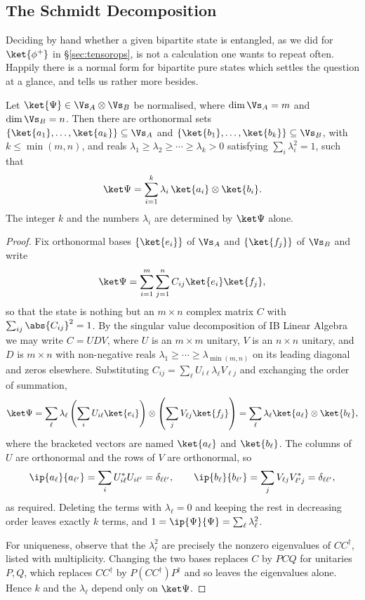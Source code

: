 \subsection{The Schmidt Decomposition}\label{sec:schmidt}

Deciding by hand whether a given bipartite state is entangled, as we did for $\ket{\phi^+}$ in \S\ref{sec:tensorops}, is not a calculation one wants to repeat often. Happily there is a normal form for bipartite pure states which settles the question at a glance, and tells us rather more besides.

\begin{theorem}
	Let $\ket{\Psi}\in\Vs_A\otimes\Vs_B$ be normalised, where $\dim\Vs_A = m$ and $\dim\Vs_B = n$. Then there are orthonormal sets $\{\ket{a_1},\dots,\ket{a_k}\}\subseteq\Vs_A$ and $\{\ket{b_1},\dots,\ket{b_k}\}\subseteq\Vs_B$, with $k\leq\min(m,n)$, and reals $\lambda_1\geq\lambda_2\geq\cdots\geq\lambda_k>0$ satisfying $\sum_i\lambda_i^2 = 1$, such that
	$$\ket\Psi = \sum_{i=1}^k\lambda_i\,\ket{a_i}\otimes\ket{b_i}.$$
	The integer $k$ and the numbers $\lambda_i$ are determined by $\ket\Psi$ alone.
\end{theorem}

\begin{proof}
	Fix orthonormal bases $\{\ket{e_i}\}$ of $\Vs_A$ and $\{\ket{f_j}\}$ of $\Vs_B$ and write
	$$\ket\Psi = \sum_{i=1}^m\sum_{j=1}^nC_{ij}\ket{e_i}\ket{f_j},$$
	so that the state is nothing but an $m\times n$ complex matrix $C$ with $\sum_{ij}\abs{C_{ij}}^2 = 1$. By the singular value decomposition of IB Linear Algebra we may write $C = UDV$, where $U$ is an $m\times m$ unitary, $V$ is an $n\times n$ unitary, and $D$ is $m\times n$ with non-negative reals $\lambda_1\geq\cdots\geq\lambda_{\min(m,n)}$ on its leading diagonal and zeros elsewhere. Substituting $C_{ij} = \sum_\ell U_{i\ell}\lambda_\ell V_{\ell j}$ and exchanging the order of summation,
	$$\ket\Psi = \sum_\ell\lambda_\ell\left(\sum_iU_{i\ell}\ket{e_i}\right)\otimes\left(\sum_jV_{\ell j}\ket{f_j}\right) = \sum_\ell \lambda_\ell\ket{a_\ell}\otimes\ket{b_\ell},$$
	where the bracketed vectors are named $\ket{a_\ell}$ and $\ket{b_\ell}$. The columns of $U$ are orthonormal and the rows of $V$ are orthonormal, so
	$$\ip{a_\ell}{a_{\ell'}} = \sum_i U_{i\ell}^*U_{i\ell'} = \delta_{\ell\ell'}, \qquad \ip{b_\ell}{b_{\ell'}} = \sum_jV_{\ell j}V_{\ell' j}^* = \delta_{\ell\ell'},$$
	as required. Deleting the terms with $\lambda_\ell = 0$ and keeping the rest in decreasing order leaves exactly $k$ terms, and $1 = \ip{\Psi}{\Psi} = \sum_\ell\lambda_\ell^2$.

	For uniqueness, observe that the $\lambda_\ell^2$ are precisely the nonzero eigenvalues of $CC^\dagger$, listed with multiplicity. Changing the two bases replaces $C$ by $PCQ$ for unitaries $P,Q$, which replaces $CC^\dagger$ by $P(CC^\dagger)P^\dagger$ and so leaves the eigenvalues alone. Hence $k$ and the $\lambda_\ell$ depend only on $\ket\Psi$.
\end{proof}


